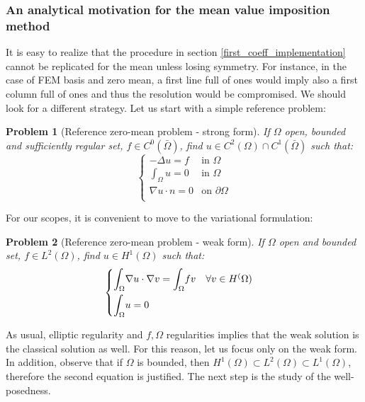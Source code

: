 \documentclass[a4paper,11pt]{article}
\newtheorem{problem}{Problem}
\begin{document}
\subsubsection{An analytical motivation for the mean value imposition method}
\noindent It is easy to realize that the procedure in section \ref{first_coeff_implementation} cannot be replicated for the mean unless losing symmetry. For instance, in the case of FEM basis and zero mean, a first line full of ones would imply also a first column full of ones and thus the resolution would be compromised. We should look for a different strategy. Let us start with a simple reference problem: \\
\begin{problem}[Reference zero-mean problem - strong form] If $\Omega$ open, bounded and sufficiently regular set, $f\in C^0(\bar{\Omega})$, find $u\in C^2(\Omega)\cap C^1(\bar{\Omega})$ such that:
\begin{equation*}
\begin{cases}
-\Delta{u}=f & \text{in } \Omega\\
\int_{\Omega} u = 0 & \text{in } \Omega \\
\nabla u \cdot n = 0 & \text{on } \partial \Omega \\
\end{cases}
\end{equation*}
\end{problem}\vspace{3mm}
\noindent For our scopes, it is convenient to move to the variational formulation:
\begin{problem}[Reference zero-mean problem - weak form]  \label{reference_problem} If $\Omega$ open and bounded set, $f\in L^2(\Omega)$, find $u\in H^1(\Omega)$ such that:
	\begin{equation*}
	\begin{cases}
	\mathlarger{\int}_{\Omega}\nabla u \cdot \nabla v = \mathlarger{\int}_{\Omega} fv \quad \forall v \in H^(\Omega)\\[2ex]
	\mathlarger{\int}_{\Omega}u = 0
	\end{cases}
	\end{equation*}
\end{problem}
\noindent As usual, elliptic regularity and $f,\Omega$ regularities implies that the weak solution is the classical solution as well. For this reason, let us focus only on the weak form. In addition, observe that if $\Omega$ is bounded, then $H^1(\Omega) \subset L^2(\Omega) \subset L^1(\Omega)$, therefore the second equation is justified. The next step is the study of the well-posedness.
\end{document}
